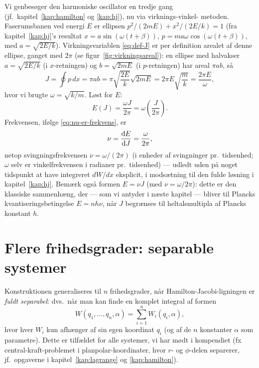 \begin{eksempel}
Vi genbesøger den harmoniske oscillator en tredje gang (jf.\
kapitel~\ref{kap:hamilton} og \ref{kap:hj}), nu via virknings-vinkel-
metoden. Faserumsbanen ved energi $E$ er ellipsen
$p^2/(2mE)+x^2/(2E/k)=1$ (fra kapitel~\ref{kap:hj}'s resultat
$x=a\sin(\omega(t+\beta))$, $p=ma\omega\cos(\omega(t+\beta))$, med
$a=\sqrt{2E/k}$). Virkningsvariablen \eqref{eq:def-J} er per
definition arealet af denne ellipse, ganget med $2\pi$ (se
figur~\ref{fig:virkningsareal}): en ellipse med halvakser
$a=\sqrt{2E/k}$ (i $x$-retningen) og $b=\sqrt{2mE}$ (i $p$-retningen)
har areal $\pi a b$, så
\begin{equation}
  J = \oint p\,dx = \pi ab = \pi\sqrt{\frac{2E}{k}}\sqrt{2mE} = 2\pi E\sqrt{\frac{m}{k}} = \frac{2\pi E}{\omega},
\end{equation}
hvor vi brugte $\omega=\sqrt{k/m}$. Løst for $E$:
\begin{equation}
  E(J) = \frac{\omega J}{2\pi} = \omega\left(\frac{J}{2\pi}\right).
\end{equation}
Frekvensen, ifølge \eqref{eq:nu-er-frekvens}, er
\begin{equation}
  \nu = \dv{E}{J} = \frac{\omega}{2\pi},
\end{equation}
netop svingningsfrekvensen $\nu=\omega/(2\pi)$ (i enheder af
svingninger pr.\ tidsenhed; $\omega$ selv er vinkelfrekvensen i
radianer pr.\ tidsenhed) — udledt uden på noget tidspunkt at have
integreret $dW/dx$ eksplicit, i modsætning til den fulde løsning i
kapitel~\ref{kap:hj}. Bemærk også formen $E=\nu J$ (med $\nu=\omega/2\pi$):
dette er den klassiske sammenhæng, der — som vi antyder i næste kapitel
— bliver til Plancks kvantiseringsbetingelse $E=nh\nu$, når $J$
begrænses til heltalsmultipla af Plancks konstant $h$.
\end{eksempel}

\section{Flere frihedsgrader: separable systemer}

Konstruktionen generaliseres til $n$ frihedsgrader, når
Hamilton-Jacobi-ligningen er \emph{fuldt separabel}: dvs.\ når man kan
finde en komplet integral af formen
\begin{equation}
  W(q_1,\dots,q_n,\alpha) = \sum_{i=1}^n W_i(q_i,\alpha),
\end{equation}
hvor hver $W_i$ kun afhænger af sin egen koordinat $q_i$ (og af de
$n$ konstanter $\alpha$ som parametre). Dette er tilfældet for alle
systemer, vi har mødt i kompendiet (fx central-kraft-problemet i
planpolar-koordinater, hvor $r$- og $\phi$-delen separerer, jf.\
opgaverne i kapitel~\ref{kap:lagrange} og \ref{kap:hamilton}).


